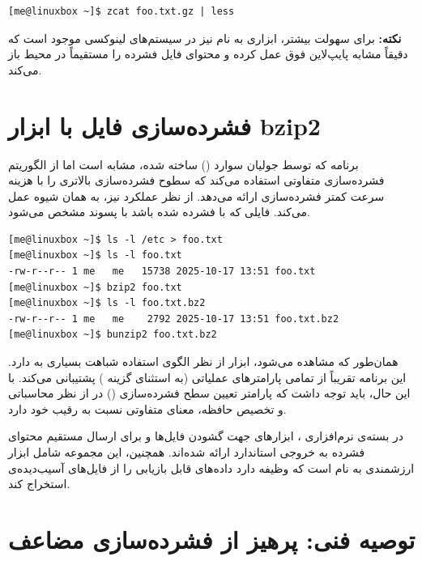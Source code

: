 \begin{latin}
\begin{lstlisting}
[me@linuxbox ~]$ zcat foo.txt.gz | less
\end{lstlisting}
\end{latin}

\begin{note}
\textbf{نکته:} برای سهولت بیشتر، ابزاری به نام  نیز در سیستم‌های لینوکسی موجود است که دقیقاً مشابه پایپ‌لاین فوق عمل کرده و محتوای فایل فشرده را مستقیماً در محیط  باز می‌کند.
\end{note}

\section{فشرده‌سازی فایل با ابزار bzip2}

برنامه  که توسط جولیان سوارد () ساخته شده، مشابه  است اما از الگوریتم فشرده‌سازی متفاوتی استفاده می‌کند که سطوح فشرده‌سازی بالاتری را با هزینه سرعت کمتر فشرده‌سازی ارائه می‌دهد. از نظر عملکرد نیز، به همان شیوه  عمل می‌کند. فایلی که با  فشرده شده باشد با پسوند  مشخص می‌شود.

\begin{latin}
\begin{lstlisting}
[me@linuxbox ~]$ ls -l /etc > foo.txt
[me@linuxbox ~]$ ls -l foo.txt
-rw-r--r-- 1 me   me   15738 2025-10-17 13:51 foo.txt
[me@linuxbox ~]$ bzip2 foo.txt
[me@linuxbox ~]$ ls -l foo.txt.bz2
-rw-r--r-- 1 me   me    2792 2025-10-17 13:51 foo.txt.bz2
[me@linuxbox ~]$ bunzip2 foo.txt.bz2
\end{lstlisting}
\end{latin}

همان‌طور که مشاهده می‌شود، ابزار  از نظر الگوی استفاده شباهت بسیاری به  دارد. این برنامه تقریباً از تمامی پارامترهای عملیاتی  (به استثنای گزینه ) پشتیبانی می‌کند. با این حال، باید توجه داشت که پارامتر تعیین سطح فشرده‌سازی () در  از نظر محاسباتی و تخصیص حافظه، معنای متفاوتی نسبت به رقیب خود دارد.

در بسته‌ی نرم‌افزاری ، ابزارهای  جهت گشودن فایل‌ها و  برای ارسال مستقیم محتوای فشرده به خروجی استاندارد ارائه شده‌اند. همچنین، این مجموعه شامل ابزار ارزشمندی به نام  است که وظیفه دارد داده‌های قابل بازیابی را از فایل‌های آسیب‌دیده‌ی  استخراج کند.

\section{توصیه فنی: پرهیز از فشرده‌سازی مضاعف}

